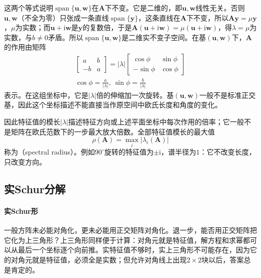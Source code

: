 这两个等式说明$\operatorname{span}\{\bm u,\bm w\}$在$\bm A$下不变。它是二维的，即$\bm u,\bm w$线性无关。否则$\bm u,\bm w$（不全为零）只张成一条直线$\operatorname{span}\{\bm y\}$，这条直线在$\bm A$下不变，所以$\bm A\bm y=\mu\bm y$，$\mu$为实数；而$\bm u+\mathrm i\bm w$是$\bm y$的复数倍，于是$\bm A(\bm u+\mathrm i\bm w)=\mu(\bm u+\mathrm i\bm w)$，得$\lambda=\mu$为实数，与$b\neq0$矛盾。所以$\operatorname{span}\{\bm u,\bm w\}$是二维实不变子空间。在基$(\bm u,\bm w)$下，$\bm A$的作用由矩阵
\[
\begin{gathered}
\begin{bmatrix}a&b\\-b&a\end{bmatrix}
 =|\lambda|\begin{bmatrix}\cos\phi&\sin\phi\\-\sin\phi&\cos\phi\end{bmatrix}\\
\cos\phi=\frac{a}{|\lambda|},\ \sin\phi=\frac{b}{|\lambda|}
\end{gathered}
\]
表示。在这组坐标中，它是$|\lambda|$倍的伸缩加一次旋转。基$(\bm u,\bm w)$一般不是标准正交基，因此这个坐标描述不能直接当作原空间中欧氏长度和角度的变化。

因此特征值的模长$|\lambda|$描述特征方向或上述平面坐标中每次作用的倍率；它一般不是矩阵在欧氏范数下的一步最大放大倍数。全部特征值模长的最大值
\[
 \rho(\bm A)=\max_i|\lambda_i(\bm A)|
\]
称为（spectral radius）。例如$90^\circ$旋转的特征值为$\pm\mathrm i$，谱半径为$1$：它不改变长度，只改变方向。

\subsection{实Schur分解}

\paragraph{实Schur形}

一般方阵未必能对角化，更未必能用正交矩阵对角化。退一步，能否用正交矩阵把它化为上三角形？上三角形同样便于计算：对角元就是特征值，解方程和求幂都可以从最后一个坐标逐个向前推。实特征值不够时，实上三角形不可能存在，因为它的对角元就是特征值，必须全是实数；但允许对角线上出现$2\times2$块以后，答案总是肯定的。

